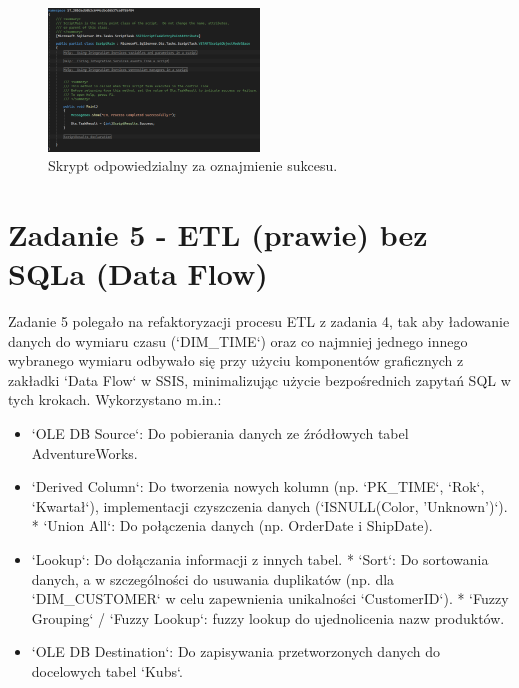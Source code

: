 \documentclass[a4paper,12pt]{article}
\begin{document}
\begin{figure}[H]
    \centering
    \includegraphics[width=0.5\textwidth]{images/4_script.png}
    \caption{Skrypt odpowiedzialny za oznajmienie sukcesu.}
    \label{fig:zad4_script}
\end{figure}

\section{Zadanie 5 - ETL (prawie) bez SQLa (Data Flow)}

Zadanie 5 polegało na refaktoryzacji procesu ETL z zadania 4, tak aby ładowanie danych do wymiaru czasu (`DIM\_TIME`) oraz co najmniej jednego innego wybranego wymiaru odbywało się przy użyciu komponentów graficznych z zakładki `Data Flow` w SSIS, minimalizując użycie bezpośrednich zapytań SQL w tych krokach. Wykorzystano m.in.:
\begin{itemize}
    \item `OLE DB Source`: Do pobierania danych ze źródłowych tabel AdventureWorks.
    \item `Derived Column`: Do tworzenia nowych kolumn (np. `PK\_TIME`, `Rok`, `Kwartał`), implementacji czyszczenia danych (`ISNULL(Color, 'Unknown')`).
          *   `Union All`: Do połączenia danych (np. OrderDate i ShipDate).
    \item `Lookup`: Do dołączania informacji z innych tabel.
          *   `Sort`: Do sortowania danych, a w szczególności do usuwania duplikatów (np. dla `DIM\_CUSTOMER` w celu zapewnienia unikalności `CustomerID`).
          *   `Fuzzy Grouping` / `Fuzzy Lookup`: fuzzy lookup do ujednolicenia nazw produktów.
    \item `OLE DB Destination`: Do zapisywania przetworzonych danych do docelowych tabel `Kubs`.
\end{itemize}
\end{document}
